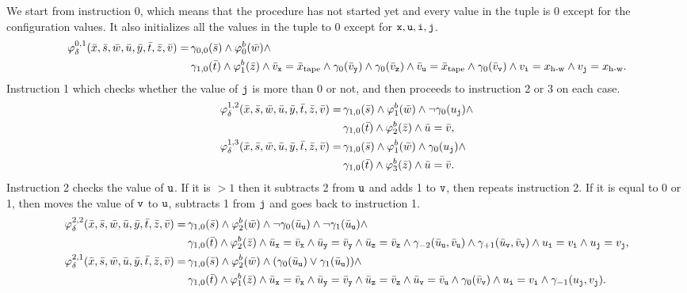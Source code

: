 We start from instruction 0, which means that the procedure has not started yet and every value in the tuple is 0 except for the configuration values. It also initializes all the values in the tuple to 0 except for $\mathtt{x},\mathtt{u},\mathtt{i},\mathtt{j}$.
\begin{align*}
\varphi^{0,1}_{\delta}(\bar{x},\bar{s},\bar{w},\bar{u},\bar{y},\bar{t},\bar{z},\bar{v}) = \,&\gamma_{0,0}(\bar{s})\wedge\varphi^b_0(\bar{w}) \wedge \\ &\gamma_{1,0}(\bar{t}) \wedge \varphi^b_1(\bar{z}) \wedge 
\bar{v}_{\mathtt{x}} = \bar{x}_{\text{tape}} \wedge 
\gamma_0(\bar{v}_{\mathtt{y}}) \wedge 
\gamma_0(\bar{v}_{\mathtt{z}}) \wedge 
\bar{v}_{\mathtt{u}} = \bar{x}_{\text{tape}} \wedge 
\gamma_0(\bar{v}_{\mathtt{v}}) \wedge 
v_{\mathtt{i}} = x_{\text{h-w}} \wedge v_{\mathtt{j}} = x_{\text{h-w}}.
\end{align*}
Instruction 1 which checks whether the value of $\mathtt{j}$ is more than 0 or not, and then proceeds to instruction 2 or 3 on each case.
\begin{align*}
\varphi^{1,2}_{\delta}(\bar{x},\bar{s},\bar{w},\bar{u},\bar{y},\bar{t},\bar{z},\bar{v}) = 
\,&\gamma_{1,0}(\bar{s}) \wedge \varphi^b_1(\bar{w}) \wedge \neg \gamma_0(u_{\mathtt{j}}) \wedge \\ &\gamma_{1,0}(\bar{t}) \wedge \varphi^b_2(\bar{z}) \wedge \bar{u} = \bar{v}, \\
\varphi^{1,3}_{\delta}(\bar{x},\bar{s},\bar{w},\bar{u},\bar{y},\bar{t},\bar{z},\bar{v}) = 
\,&\gamma_{1,0}(\bar{s}) \wedge \varphi^b_1(\bar{w}) \wedge \gamma_0(u_{\mathtt{j}}) \wedge \\ &\gamma_{1,0}(\bar{t}) \wedge \varphi^b_3(\bar{z}) \wedge \bar{u} = \bar{v}.
\end{align*}
Instruction 2 checks the value of $\mathtt{u}$. If it is $> 1$ then it subtracts 2 from $\mathtt{u}$ and adds 1 to $\mathtt{v}$, then repeats instruction 2. If it is equal to 0 or 1, then moves the value of $\mathtt{v}$ to $\mathtt{u}$, subtracts 1 from $\mathtt{j}$ and goes back to instruction 1.
\begin{align*}
\varphi^{2,2}_{\delta}(\bar{x},\bar{s},\bar{w},\bar{u},\bar{y},\bar{t},\bar{z},\bar{v}) = 
\,&\gamma_{1,0}(\bar{s}) \wedge \varphi^b_2(\bar{w}) \wedge \neg \gamma_0(\bar{u}_{\mathtt{u}}) \wedge \neg \gamma_1(\bar{u}_{\mathtt{u}}) \wedge \\ &\gamma_{1,0}(\bar{t}) \wedge \varphi^b_2(\bar{z}) \wedge
\bar{u}_{\mathtt{x}} = \bar{v}_{\mathtt{x}} \wedge
\bar{u}_{\mathtt{y}} = \bar{v}_{\mathtt{y}} \wedge
\bar{u}_{\mathtt{z}} = \bar{v}_{\mathtt{z}} \wedge
\gamma_{-2}(\bar{u}_{\mathtt{u}},\bar{v}_{\mathtt{u}}) \wedge
\gamma_{+1}(\bar{u}_{\mathtt{v}},\bar{v}_{\mathtt{v}}) \wedge u_{\mathtt{i}} = v_{\mathtt{i}} \wedge u_{\mathtt{j}} = v_{\mathtt{j}},\\
\varphi^{2,1}_{\delta}(\bar{x},\bar{s},\bar{w},\bar{u},\bar{y},\bar{t},\bar{z},\bar{v}) = \,&\gamma_{1,0}(\bar{s}) \wedge \varphi^b_2(\bar{w}) \wedge ( \gamma_0(\bar{u}_{\mathtt{u}}) \vee \gamma_1(\bar{u}_{\mathtt{u}})) \wedge \\ 
&\gamma_{1,0}(\bar{t}) \wedge \varphi^b_1(\bar{z}) \wedge
\bar{u}_{\mathtt{x}} = \bar{v}_{\mathtt{x}} \wedge
\bar{u}_{\mathtt{y}} = \bar{v}_{\mathtt{y}} \wedge
\bar{u}_{\mathtt{z}} = \bar{v}_{\mathtt{z}} \wedge
\bar{u}_{\mathtt{v}} = \bar{v}_{\mathtt{u}} \wedge
\gamma_0(\bar{v}_{\mathtt{v}}) \wedge
u_{\mathtt{i}} = v_{\mathtt{i}} \wedge \gamma_{-1}(u_{\mathtt{j}},v_{\mathtt{j}}).	
\end{align*}
